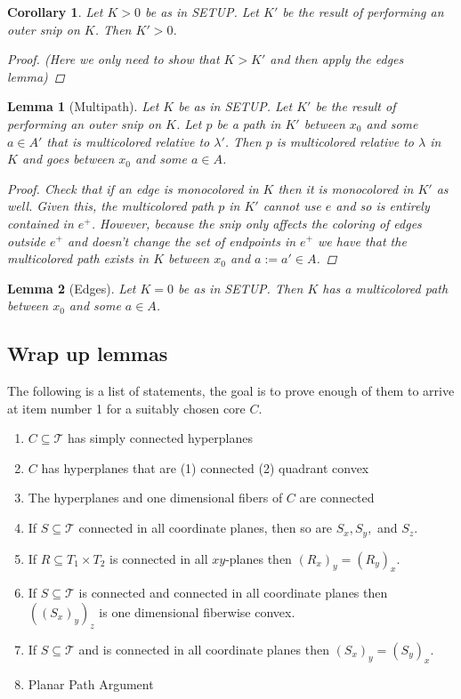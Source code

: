 \documentclass{article}
\newcommand{\sxyz}{((S_x)_y)_z}
\theoremstyle{mystyle}
\newtheorem{lem}{Lemma}[section]
\newtheorem*{cor*}{Corollary}
\theoremstyle{remark}
\begin{document}
\begin{cor*}
	Let \(K > 0\) be as in SETUP. Let \(K'\) be the result of performing an outer snip on \(K\). Then \(K' > 0\).
	\begin{proof}
        (Here we only need to show that \(K > K'\) and then apply the edges lemma)
		
	\end{proof}
\end{cor*}
\begin{lem}
	[Multipath]
	 \label{lem:multi} 
	Let \(K\) be as in SETUP. Let \(K'\) be the result of performing an outer snip on \(K\). Let \(p\) be a path in \(K'\) between \(x_{0}\) and some \(a \in A'\) that is {\em multicolored} relative to \(\lambda'\). Then \(p\) is multicolored relative to \(\lambda\) in \(K\) and goes between \(x_{0}\) and some \(a \in A\).
	\begin{proof}
		Check that if an edge is monocolored in \(K\) then it is monocolored in \(K'\) as well. Given this, the multicolored path \(p\) in \(K'\) cannot use \(e\) and so is entirely contained in \(e^{+}\). However, because the snip only affects the coloring of edges outside \(e^{+}\) and doesn't change the set of endpoints in \(e^{+}\) we have that the multicolored path exists in \(K\) between \(x_{0}\) and \(a:=a' \in A\).
	\end{proof}
\end{lem}
\begin{lem}
	[Edges]
	 \label{edges} 
	  Let \(K=0\) be as in SETUP. Then \(K\) has a multicolored path between \(x_{0}\) and some \(a \in A\).
\end{lem}%

\subsection{Wrap up lemmas}
The following is a list of statements, the goal is to prove enough of them to arrive at item number 1 for a suitably chosen core \(C\).
\begin{enumerate}
    \item \(C \subseteq \mathscr{T}\) has simply connected hyperplanes
    \item \(C\) has hyperplanes that are (1) connected (2) quadrant convex
    \item The hyperplanes and one dimensional fibers of \(C\) are connected
    \item If \(S \subseteq \mathscr{T}\) connected in all coordinate planes, then so are \(S_{x}, S_{y},\) and \(S_{z}\).
    \item If \(R \subseteq T_{1} \times T_{2}\) is connected in all \(xy\)-planes then \( \left( R_{x} \right)_{y} = \left( R_{y} \right)_{x}\).
    \item If \(S \subseteq \mathscr{T}\) is connected and connected in all coordinate planes then \(\sxyz\) is one dimensional fiberwise convex. 
    \item If \(S \subseteq \mathscr{T}\) and is connected in all coordinate planes then \( \left( S_{x} \right)_{y} = \left( S_{y} \right)_{x}\).
    \item Planar Path Argument
\end{enumerate}
\end{document}
